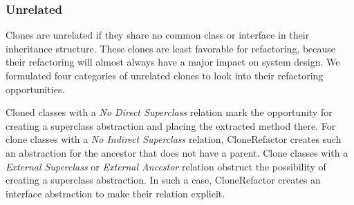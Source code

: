 \documentclass[runningheads]{llncs}
\begin{document}

\subsubsection{Unrelated}
Clones are unrelated if they share no common class or interface in their inheritance structure. These clones are least favorable for refactoring, because their refactoring will almost always have a major impact on system design. We formulated four categories of unrelated clones to look into their refactoring opportunities.

Cloned classes with a \textit{No Direct Superclass} relation mark the opportunity for creating a superclass abstraction and placing the extracted method there. For clone classes with a \textit{No Indirect Superclass} relation, CloneRefactor creates such an abstraction for the ancestor that does not have a parent. Clone classes with a \textit{External Superclass} or \textit{External Ancestor} relation obstruct the possibility of creating a superclass abstraction. In such a case, CloneRefactor creates an interface abstraction to make their relation explicit.


\end{document}
